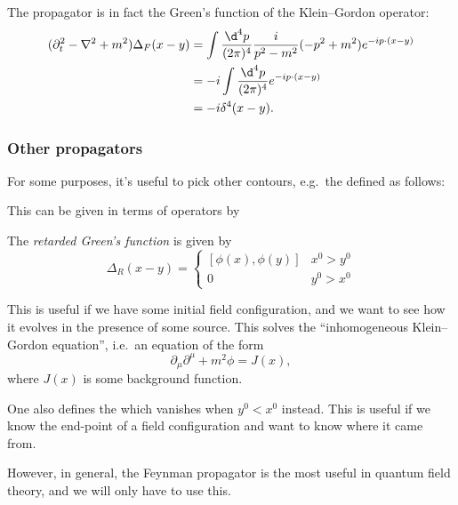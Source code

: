\documentclass[a4paper]{article}
\begin{document}
The propagator is in fact the Green's function of the Klein--Gordon operator:
\begin{align*}
  (\partial_t^2 - \nabla^2 + m^2) \Delta_F(x - y) &= \int \frac{\d^4 p}{(2\pi)^4} \frac{i}{p^2 - m^2}(-p^2 + m^2) e^{-ip\cdot(x - y)}\\
  &= -i \int \frac{\d^4 p}{(2\pi)^4} e^{-ip\cdot(x - y)}\\
  &= -i \delta^4(x - y).
\end{align*}

\subsubsection*{Other propagators}
For some purposes, it's useful to pick other contours, e.g.\ the  defined as follows:
\begin{center}
\end{center}
This can be given in terms of operators by
\begin{defi}
  The \emph{retarded Green's function} is given by
  \[
    \Delta_R(x - y) =
    \begin{cases}
      [\phi(x), \phi(y)]& x^0 > y^0\\
      0 & y^0 > x^0
    \end{cases}
  \]
\end{defi}
This is useful if we have some initial field configuration, and we want to see how it evolves in the presence of some source. This solves the ``inhomogeneous Klein--Gordon equation'', i.e.\ an equation of the form
\[
  \partial_\mu \partial^\mu + m^2 \phi = J(x),
\]
where $J(x)$ is some background function.

One also defines the  which vanishes when $y^0 < x^0$ instead. This is useful if we know the end-point of a field configuration and want to know where it came from.

However, in general, the Feynman propagator is the most useful in quantum field theory, and we will only have to use this.
\end{document}
